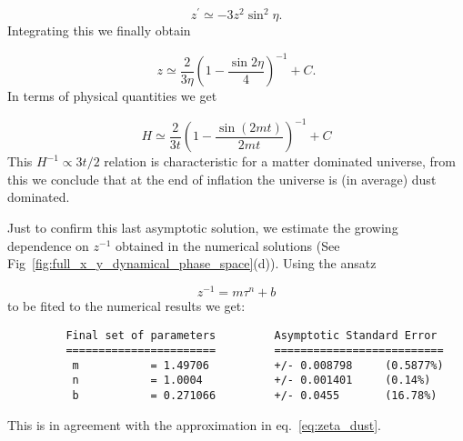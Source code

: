 \documentclass[12pt,letterpaper,twoside]{book}
\newcommand\etcomment[1]{\MakeUppercase{\mytexttt{\textcolor{blue}{#1}}}}
\begin{document}
\begin{equation}
    z^\prime  \simeq -3z^2 \sin^2 \eta.
\end{equation}
Integrating this we finally obtain

\begin{equation}\label{eq:zeta_dust}
    z  \simeq \frac{2}{3\eta} \left( 1 - \frac{\sin 2\eta}{4}\right)^{-1} + C.
\end{equation}
In terms of physical quantities we get

\begin{equation}\label{eq:H_graceful}
    H  \simeq \frac{2}{3 t} \left( 1 - \frac{\sin (2 m t)}{2 m t}\right)^{-1} + C
\end{equation}
This $H^{-1} \propto 3t/2$ relation is characteristic for a matter dominated
universe, from this we conclude that at the end of inflation the universe is (in
average) dust dominated.

Just to confirm this last asymptotic solution, we estimate the growing dependence
on $z^{-1}$ obtained in the  numerical solutions (See
Fig~\ref{fig:full_x_y_dynamical_phase_space}(d)). Using  the ansatz

\begin{equation}
    z^{-1}= m \tau^n + b
\end{equation}
to be fited to the numerical results we get:

\etcomment{Is this test necessary? is too pedestrian? }
\begin{center}
\begin{verbatim}
         Final set of parameters         Asymptotic Standard Error
         =======================         ==========================
          m           = 1.49706          +/- 0.008798     (0.5877%)
          n           = 1.0004           +/- 0.001401     (0.14%)
          b           = 0.271066         +/- 0.0455       (16.78%)
\end{verbatim}
\end{center}
This is in agreement with the approximation in eq.~\eqref{eq:zeta_dust}.
\end{document}
